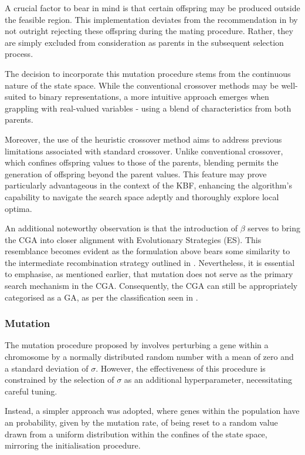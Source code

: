 \documentclass[10pt]{article}
\begin{document}
\begin{multicols}{2}
A crucial factor to bear in mind is that certain offspring may be produced outside the feasible region. This implementation deviates from the recommendation in \cite{Michalewicz_2011} by not outright rejecting these offspring during the mating procedure. Rather, they are simply excluded from consideration as parents in the subsequent selection process.

The decision to incorporate this mutation procedure stems from the continuous nature of the state space. While the conventional crossover methods may be well-suited to binary representations, a more intuitive approach emerges when grappling with real-valued variables - using a blend of characteristics from both parents.

Moreover, the use of the heuristic crossover method aims to address previous limitations associated with standard crossover. Unlike conventional crossover, which confines offspring values to those of the parents, blending permits the generation of offspring beyond the parent values. This feature may prove particularly advantageous in the context of the KBF, enhancing the algorithm's capability to navigate the search space adeptly and thoroughly explore local optima.

An additional noteworthy observation is that the introduction of $\beta$ serves to bring the CGA into closer alignment with Evolutionary Strategies (ES). This resemblance becomes evident as the formulation above bears some similarity to the intermediate recombination strategy outlined in \cite{salimans2017evolution}. Nevertheless, it is essential to emphasise, as mentioned earlier, that mutation does not serve as the primary search mechanism in the CGA. Consequently, the CGA can still be appropriately categorised as a GA, as per the classification seen in \cite{10.1007/BFb0029787}.

\subsubsection{Mutation}

The mutation procedure proposed by \cite{PGA} involves perturbing a gene within a chromosome by a normally distributed random number with a mean of zero and a standard deviation of $\sigma$. However, the effectiveness of this procedure is constrained by the selection of $\sigma$ as an additional hyperparameter, necessitating careful tuning. 

Instead, a simpler approach was adopted, where genes within the population have an probability, given by the mutation rate, of being reset to a random value drawn from a uniform distribution within the confines of the state space, mirroring the initialisation procedure.


\end{multicols}
\end{document}
